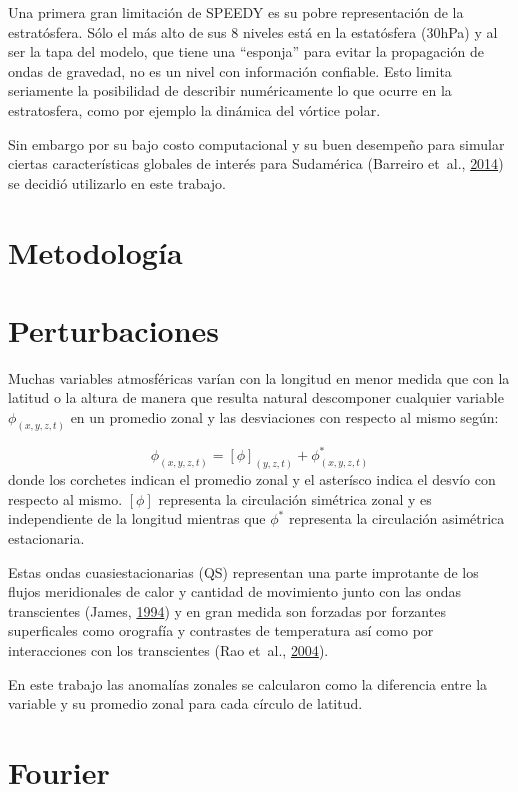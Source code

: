 \documentclass[spanish,a4paper,12pt,oneside]{book}
\begin{document}
Una primera gran limitación de SPEEDY es su pobre representación de la
estratósfera. Sólo el más alto de sus 8 niveles está en la estatósfera
(30hPa) y al ser la tapa del modelo, que tiene una ``esponja'' para
evitar la propagación de ondas de gravedad, no es un nivel con
información confiable. Esto limita seriamente la posibilidad de
describir numéricamente lo que ocurre en la estratosfera, como por
ejemplo la dinámica del vórtice polar.

Sin embargo por su bajo costo computacional y su buen desempeño para
simular ciertas características globales de interés para Sudamérica
(Barreiro et~al., \protect\hyperlink{ref-Barreiro2014}{2014}) se decidió
utilizarlo en este trabajo.

\section{Metodología}\label{metodologia}

\section*{Perturbaciones}

Muchas variables atmosféricas varían con la longitud en menor medida que
con la latitud o la altura de manera que resulta natural descomponer
cualquier variable \(\phi_{(x, y, z, t)}\) en un promedio zonal y las
desviaciones con respecto al mismo según:

\[
\phi_{(x, y, z, t)} = [\phi]_{(y, z, t)} + \phi_{(x, y, z, t)}^*
\] donde los corchetes indican el promedio zonal y el asterísco indica
el desvío con respecto al mismo. \([\phi]\) representa la circulación
simétrica zonal y es independiente de la longitud mientras que
\(\phi^*\) representa la circulación asimétrica estacionaria.

Estas ondas cuasiestacionarias (QS) representan una parte improtante de
los flujos meridionales de calor y cantidad de movimiento junto con las
ondas transcientes (James, \protect\hyperlink{ref-James}{1994}) y en
gran medida son forzadas por forzantes superficales como orografía y
contrastes de temperatura así como por interacciones con los
transcientes (Rao et~al., \protect\hyperlink{ref-Rao2004}{2004}).

En este trabajo las anomalías zonales se calcularon como la diferencia
entre la variable y su promedio zonal para cada círculo de latitud.

\section*{Fourier}
\end{document}
